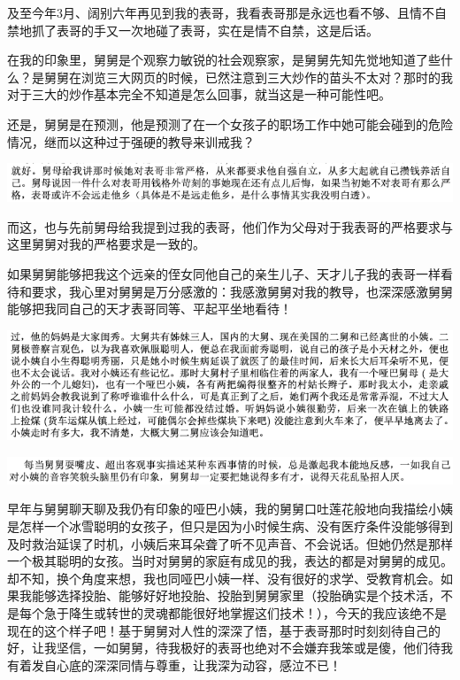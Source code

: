 \documentclass[9pt, b5paper]{article}
\begin{document}
及至今年3月、阔别六年再见到我的表哥，我看表哥那是永远也看不够、且情不自禁地抓了表哥的手又一次地碰了表哥，实在是情不自禁，这是后话。 

在我的印象里，舅舅是个观察力敏锐的社会观察家，是舅舅先知先觉地知道了些什么？是舅舅在浏览三大网页的时候，已然注意到三大炒作的苗头不太对？那时的我对于三大的炒作基本完全不知道是怎么回事，就当这是一种可能性吧。

还是，舅舅是在预测，他是预测了在一个女孩子的职场工作中她可能会碰到的危险情况，继而以这种过于强硬的教导来训戒我？

\begin{center}
\includegraphics[width=.9\linewidth]{./pic/backups_plans_20210412_112222.png}
\end{center}

而这，也与先前舅母给我提到过我的表哥，他们作为父母对于我表哥的严格要求与这里舅舅对我的严格要求是一致的。

如果舅舅能够把我这个远亲的侄女同他自己的亲生儿子、天才儿子我的表哥一样看待和要求，我心里对舅舅是万分感激的：我感激舅舅对我的教导，也深深感激舅舅能够把我同自己的天才表哥同等、平起平坐地看待！

\begin{center}
\includegraphics[width=.9\linewidth]{./pic/backups_plans_20210414_101343.png}
\end{center}

\begin{center}
\includegraphics[width=.9\linewidth]{./pic/backups_plans_20210412_114832.png}
\end{center}

早年与舅舅聊天聊及我仍有印象的哑巴小姨，我的舅舅口吐莲花般地向我描绘小姨是怎样一个冰雪聪明的女孩子，但只是因为小时候生病、没有医疗条件没能够得到及时救治延误了时机，小姨后来耳朵聋了听不见声音、不会说话。但她仍然是那样一个极其聪明的女孩。当时对舅舅的家庭有成见的我，表达的都是对舅舅的成见。却不知，换个角度来想，我也同哑巴小姨一样、没有很好的求学、受教育机会。如果我能够选择投胎、能够好好地投胎、投胎到舅舅家里（投胎确实是个技术活，不是每个急于降生或转世的灵魂都能很好地掌握这们技术！），今天的我应该绝不是现在的这个样子吧！基于舅舅对人性的深深了悟，基于表哥那时时刻刻待自己的好，让我坚信，一如舅舅，待我极好的表哥也绝对不会嫌弃我笨或是傻，他们待我有着发自心底的深深同情与尊重，让我深为动容，感泣不已！
\end{document}
